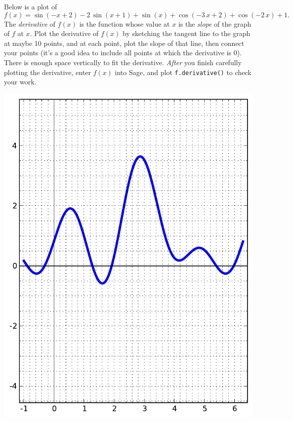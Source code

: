 Below is a plot of $$f(x)=\sin\left(-x + 2\right) - 2 \, \sin\left(x + 1\right) + \sin\left(x\right) + \cos\left(-3 \, x + 2\right) + \cos\left(-2 \, x\right) + 1.$$  The {\em \color{red}derivative} of $f(x)$ is the function whose value at $x$ is the {\em slope} of the graph of $f$ at $x$.  Plot the derivative of $f(x)$ by sketching the tangent line to the graph at maybe 10 points, and at each point, plot the slope of that line, then connect your points (it's a good idea to include all points at which the derivative is 0).  There is enough space vertically to fit the derivative.  {\em After} you finish carefully plotting the derivative, enter $f(x)$ into Sage, and plot {\color{blue}\verb|f.derivative()|} to check your work.
\begin{center}\includegraphics{functions/60.pdf}\end{center}\newpage

